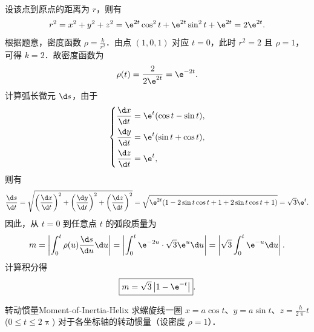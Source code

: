 \begin{solution}
    设该点到原点的距离为 $r$，则有
    \begin{equation}
        r^2 = x^2 + y^2 + z^2 = \e^{2t} \cos^2 t + \e^{2t} \sin^2 t + \e^{2t} = 2\e^{2t}.
    \end{equation}
    根据题意，密度函数 $\rho = \frac{k}{r^2}$．由点 $(1, 0, 1)$ 对应 $t = 0$，此时 $r^2 = 2$ 且 $\rho = 1$，可得 $k = 2$．故密度函数为
    \begin{equation}
        \rho(t) = \frac{2}{2\e^{2t}} = \e^{-2t}.
    \end{equation}
    计算弧长微元 $\d s$，由于
    \begin{equation}
        \left\{ \begin{aligned}
            \frac{\d x}{\d t} & = \e^t (\cos t - \sin t), \\
            \frac{\d y}{\d t} & = \e^t (\sin t + \cos t), \\
            \frac{\d z}{\d t} & = \e^t,
        \end{aligned} \right.
    \end{equation}
    则有
    \begin{equation}
        \frac{\d s}{\d t} = \sqrt{\left(\frac{\d x}{\d t}\right)^2 + \left(\frac{\d y}{\d t}\right)^2 + \left(\frac{\d z}{\d t}\right)^2} = \sqrt{\e^{2t} (1 - 2\sin t \cos t + 1 + 2\sin t \cos t + 1)} = \sqrt{3}\e^t.
    \end{equation}
    因此，从 $t = 0$ 到任意点 $t$ 的弧段质量为
    \begin{equation}
        m = \left| \int_{0}^{t} \rho(u) \frac{\d s}{\d u} \d u \right| = \left| \int_{0}^{t} \e^{-2u} \cdot \sqrt{3}\e^u \d u \right| = \left| \sqrt{3} \int_{0}^{t} \e^{-u} \d u \right| .
    \end{equation}
    计算积分得
    \begin{equation}
        \boxed{m = \sqrt{3} \left|1 - \e^{-t}\right| }.
    \end{equation}
\end{solution}

\begin{problem}{转动惯量}{Moment-of-Inertia-Helix}
    求螺旋线一圈 $x = a \cos t$、$y = a \sin t$、$z = \frac{h}{2\uppi} t$ ($0 \le t \le 2\uppi$) 对于各坐标轴的转动惯量（设密度 $\rho = 1$）．
\end{problem}

